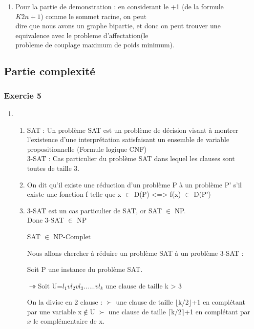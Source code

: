 \documentclass[]{article}
\begin{document}
\begin{enumerate}
\begin{enumerate}
\item Pour la partie de demonstration : en considerant le +1 (de la formule $K2n+1$) comme le sommet racine, on peut \\
dire que nous avons un graphe bipartie, et donc on peut trouver une equivalence avec le probleme d'affectation(le \\
probleme de couplage maximum de poids minimum).

\end{enumerate}


\subsection{Partie complexité}

\subsubsection{Exercie 5}

\begin{enumerate}
\item 
  \begin{enumerate}
  \item
    SAT : Un  problème SAT est un problème de décision visant à montrer l'existence d'une interprétation satisfaisant un ensemble de variable propositionnelle (Formule logique CNF)\\
    3-SAT : Cas particulier du problème SAT dans lequel les clauses sont toutes de taille 3.\\

  \item
    On dit qu'il existe une réduction d'un problème P à un problème P' s'il existe une fonction f telle que x $\in$ D(P) <=> f(x) $\in$ D(P')\\

  \item
    3-SAT est un cas particulier de SAT, or SAT $\in$ NP.\\
    Donc 3-SAT $\in$ NP

    SAT $\in$ NP-Complet

    Nous allons chercher à réduire un problème SAT à un problème 3-SAT : 

    Soit P une instance du problème SAT.
    
    $\twoheadrightarrow$Soit U={$l_1vl_2vl_3......vl_k$} une clause de taille k > 3

    On la divise en 2 clause :
    $\succ$ une clause de taille $\lfloor$k/2$\rfloor$+1 en complétant par une variable x$\notin$U 
    $\succ$ une clause de taille $\lceil$k/2$\rceil$+1 en complétant par $\overline x$ le complémentaire de x.


\end{enumerate}
\end{enumerate}
\end{enumerate}
\end{document}
